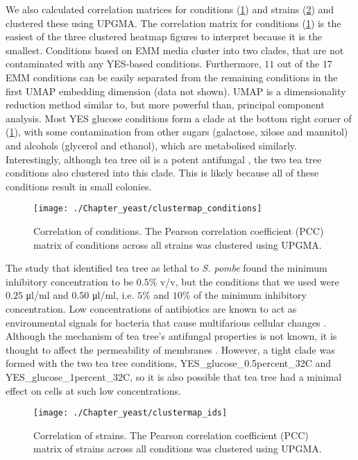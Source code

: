 We also calculated correlation matrices for conditions (\ref{fig:clustermap-conditions}) and strains (\ref{fig:clustermap-ids}) and clustered these using UPGMA. The correlation matrix for conditions (\ref{fig:clustermap-conditions}) is the easiest of the three clustered heatmap figures to interpret because it is the smallest. Conditions based on EMM media cluster into two clades, that are not contaminated with any YES-based conditions. Furthermore, $11$ out of the $17$ EMM conditions can be easily separated from the remaining conditions in the first UMAP embedding dimension \cite{McInnes2018} (data not shown). UMAP is a dimensionality reduction method similar to, but more powerful than, principal component analysis. Most YES glucose conditions form a clade at the bottom right corner of (\ref{fig:clustermap-conditions}), with some contamination from other sugars (galactose, xilose and mannitol) and alcohols (glycerol and ethanol), which are metabolised similarly. Interestingly, although tea tree oil is a potent antifungal \cite{DAuria2001}, the two tea tree conditions also clustered into this clade. This is likely because all of these conditions result in small colonies.

\begin{figure}[!hbtp]
    \centering
    \texttt{[image: ./Chapter\_yeast/clustermap\_conditions]}
    \caption{%
        Correlation of conditions.
        The Pearson correlation coefficient (PCC) matrix of conditions across all strains was clustered using UPGMA.
    }
    \label{fig:clustermap-conditions}
\end{figure}

The study that identified tea tree as lethal to \emph{S. pombe} found the minimum inhibitory concentration to be $0.5\%$ v/v, but the conditions that we used were $0.25$ μl/ml and $0.50$ μl/ml, i.e. $5\%$ and $10\%$ of the minimum inhibitory concentration. Low concentrations of antibiotics are known to act as environmental signals for bacteria that cause multifarious cellular changes \cite{Bernier2013}. Although the mechanism of tea tree's antifungal properties is not known, it is thought to affect the permeability of membranes \cite{Mazu2016}. However, a tight clade was formed with the two tea tree conditions, YES\_glucose\_0.5percent\_32C and YES\_glucose\_1percent\_32C, so it is also possible that tea tree had a minimal effect on cells at such low concentrations.

\begin{figure}[!hbtp]
    \centering
    \texttt{[image: ./Chapter\_yeast/clustermap\_ids]}
    \caption{%
        Correlation of strains.
        The Pearson correlation coefficient (PCC) matrix of strains across all conditions was clustered using UPGMA.
    }
    \label{fig:clustermap-ids}
\end{figure}


